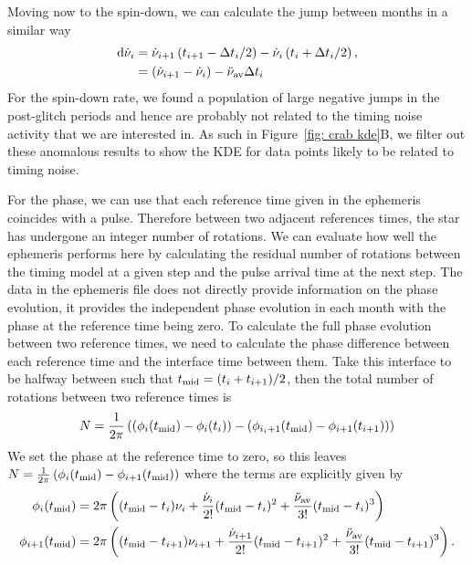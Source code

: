 \documentclass[../full_thesis/full_thesis.tex]{subfiles}
\begin{document}
Moving now to the spin-down, we can calculate the jump between months in a similar way
\begin{align}
\mathrm{d}\dot{\nu}_{i} & = \dot{\nu}_{i+1}\left(t_{i+1}-\Delta t_{i}/2\right) -  \dot{\nu}_{i}\left(t_{i}+\Delta t_{i}/2\right), \\
& = \left(\dot{\nu}_{i+1}-\dot{\nu}_{i}\right) -  \ddot{\nu}_{\textrm{av}} \Delta t_{i}
\label{eqn: crab spindown residuals}
\end{align}
For the spin-down rate, we found a population of large negative jumps in the
post-glitch periods and hence are probably not related to the timing noise
activity that we are interested in. As such in Figure~\ref{fig: crab kde}B, we
filter out these anomalous results to show the KDE for data points likely to be
related to timing noise.

For the phase, we can use that each reference time given in the ephemeris
coincides with a pulse. Therefore between two adjacent references times, the
star has undergone an integer number of rotations. We can evaluate how well the
ephemeris performs here by calculating the residual number of rotations between
the timing model at a given step and the pulse arrival time at the next step.
The data in the ephemeris file does not directly provide information on the
phase evolution, it provides the independent phase evolution in each month with
the phase at the reference time being zero. To calculate the full phase
evolution between two reference times, we need to calculate the phase
difference between each reference time and the interface time between them.
Take this interface to be halfway between such that $t_{\textrm{mid}}=(t_{i} +
t_{i+1})/2$, then the total number of rotations between two reference times is
\begin{equation}
    N = \frac{1}{2\pi}\left(\left(\phi_{i}(t_{\textrm{mid}}) - \phi_{i}(t_{i})\right) -
    \left(\phi_{i_i+1}(t_{\textrm{mid}}) - \phi_{i+1}(t_{i+1})\right)\right)
\end{equation}
We set the phase at the reference time to zero, so this leaves $N =
\frac{1}{2\pi}\left(\phi_{i}(t_{\textrm{mid}}) - \phi_{i+1}(t_{\textrm{mid}})\right)$ where the terms
are explicitly given by
\begin{align}
\phi_{i}(t_{\textrm{mid}}) & = 2\pi\left((t_{\textrm{mid}} - t_{i})\nu_{i} +  \frac{\dot{\nu}_{i}}{2!}(t_{\textrm{mid}} - t_{i})^{2}+\frac{\ddot{\nu}_{\textrm{av}}}{3!}(t_{\textrm{mid}} - t_{i})^{3}\right) \\
\phi_{i+1}(t_{\textrm{mid}}) & = 2\pi\left((t_{\textrm{mid}} - t_{i+1})\nu_{i+1} +  \frac{\dot{\nu}_{i+1}}{2!}(t_{\textrm{mid}} - t_{i+1})^{2}+\frac{\ddot{\nu}_{\textrm{av}}}{3!}(t_{\textrm{mid}} - t_{i+1})^{3}\right) .
\end{align}
\end{document}
